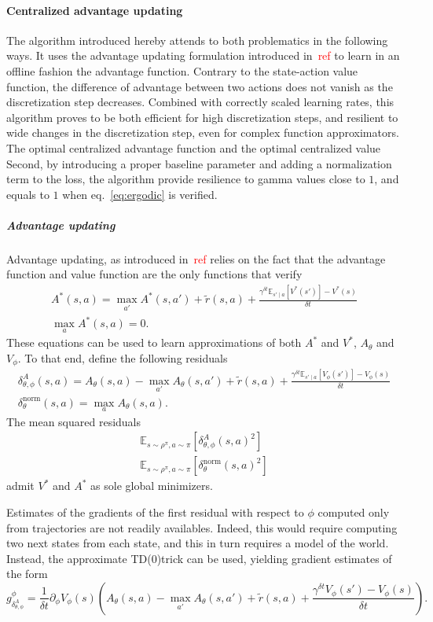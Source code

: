 \documentclass[11pt]{article}
\newcommand{\deltat}{{\delta t}}
\newcommand{\E}{\mathbb{E}}
\newcommand{\TODO}[1]{\textcolor{red}{#1}}
\newcommand{\Tdo}{TD($0$)}
\begin{document}
\paragraph{Centralized advantage updating}
The algorithm introduced hereby attends to both problematics in the following ways.
It uses the advantage updating formulation introduced in~\TODO{ref} to learn
in an offline fashion the advantage function. Contrary to the state-action value
function, the difference of advantage between two actions does not vanish as the
discretization step decreases. Combined with correctly scaled learning rates, this
algorithm proves to be both efficient for high discretization steps, and resilient
to wide changes in the discretization step, even for complex function approximators.
The optimal centralized advantage function and the optimal centralized value
Second, by introducing a proper baseline parameter and adding a normalization term
to the loss, the algorithm provide resilience to gamma values close to $1$, and
equals to $1$ when eq.~\eqref{eq:ergodic} is verified.
\subparagraph{Advantage updating}
Advantage updating, as introduced in~\TODO{ref} relies on the fact that the advantage
function and value function are the only functions that verify
\begin{gather}
	A^*(s, a) = \max\limits_{a'} A^*(s, a') + 
		\tilde{r}(s, a)
		 + 
		\frac{\gamma^\deltat \E_{s'\mid a}\left[
			V^*(s')
		\right] - V^*(s)
		}{
		\deltat
	}\\
	\max\limits_{a} A^*(s, a) = 0.
\end{gather}
These equations can be used to learn approximations of both $A^*$ and $V^*$,
$A_\theta$ and $V_\phi$. To that end, define the following residuals
\begin{gather}
	\delta^A_{\theta, \phi}(s, a) = A_\theta(s, a) -
	\max\limits_{a'} A_\theta(s, a') + 
	\tilde{r}(s, a)
	+ 
	\frac{\gamma^\deltat \E_{s'\mid a}\left[
			V_\phi(s')
		\right] - V_\phi(s)
		}{
		\deltat
	}\\
	\delta^\text{norm}_\theta(s, a) = \max\limits_{a} A_\theta(s, a).
\end{gather}
The mean squared residuals
\begin{align}
	\E_{s \sim \rho^\pi, a \sim \pi}\left[\delta^A_{\theta, \phi}(s, a)^2\right]\\
	\E_{s \sim \rho^\pi, a \sim \pi}\left[\delta^\text{norm}_{\theta}(s, a)^2\right]
\end{align}
admit $V^*$ and $A^*$ as sole global minimizers.

Estimates of the gradients of the first residual with respect to $\phi$ computed only
from trajectories are not readily availables. Indeed, this would require computing two
next states from each state, and this in turn requires a model of the world. Instead,
the approximate \Tdo trick can be used, yielding gradient estimates of the form
\begin{equation}
	g^\phi_{\delta^A_{\theta, \phi}} =
	\frac{1}{\deltat}
	\partial_\phi V_\phi(s) \left(A_\theta(s, a) -
		\max\limits_{a'} A_\theta(s, a') + 
		\tilde{r}(s, a)
		+ 
		\frac{\gamma^\deltat 
			V_\phi(s')
			- V_\phi(s)
			}{
			\deltat
	}\right).
\end{equation}
\end{document}
